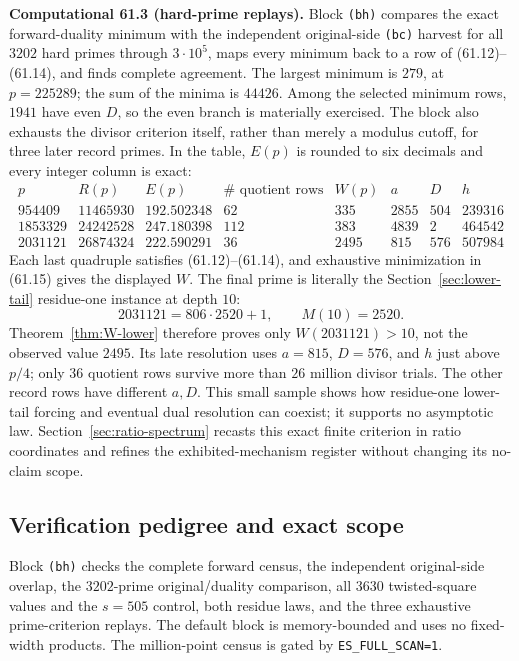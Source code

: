 \documentclass[10pt,reqno]{amsart}
\theoremstyle{definition}
\newcommand{\1}{\mathbf 1}
\begin{document}
\medskip\noindent\textbf{Computational 61.3 (hard-prime replays).}
Block \texttt{(bh)} compares the exact forward-duality minimum with the
independent original-side \texttt{(bc)} harvest for all $3202$ hard primes
through $3\cdot10^5$, maps every minimum back to a row of
(61.12)--(61.14), and finds complete agreement.  The largest minimum is
$279$, at $p=225289$; the sum of the minima is $44426$.  Among the selected
minimum rows, $1941$ have even $D$, so the even branch is materially
exercised.  The block also exhausts the divisor criterion itself, rather
than merely a modulus cutoff, for three later record primes.  In the table,
$E(p)$ is rounded to six decimals and every integer column is exact:
\begingroup\scriptsize
\begin{equation}\tag{61.17}
\begin{array}{r|r|r|r|r|r|r|r}
p&R(p)&E(p)&\#\text{ quotient rows}&W(p)&a&D&h\\ \hline
954409&11465930&192.502348&62&335&2855&504&239316\\
1853329&24242528&247.180398&112&383&4839&2&464542\\
2031121&26874324&222.590291&36&2495&815&576&507984
\end{array}
\end{equation}
\endgroup
Each last quadruple satisfies (61.12)--(61.14), and exhaustive minimization
in (61.15) gives the displayed $W$.  The final prime is literally the
Section~\ref{sec:lower-tail} residue-one instance at depth $10$:
\[
 2031121=806\cdot2520+1,
 \qquad M(10)=2520.
\]
Theorem~\ref{thm:W-lower} therefore proves only $W(2031121)>10$, not the
observed value $2495$.  Its late resolution uses $a=815$, $D=576$, and $h$
just above $p/4$; only $36$ quotient rows survive more than $26$ million
divisor trials.  The other record rows have different $a,D$.  This small
sample shows how residue-one lower-tail forcing and eventual dual resolution
can coexist; it supports no asymptotic law.  Section~\ref{sec:ratio-spectrum}
recasts this exact finite criterion in ratio coordinates and refines the
exhibited-mechanism register without changing its no-claim scope.

\subsection{Verification pedigree and exact scope}
Block \texttt{(bh)} checks the complete forward census, the independent
original-side overlap, the $3202$-prime original/duality comparison, all
$3630$ twisted-square values and the $s=505$ control, both residue laws, and
the three exhaustive prime-criterion replays.  The default block is
memory-bounded and uses no fixed-width products.  The million-point census
is gated by \texttt{ES\_FULL\_SCAN=1}.
\end{document}
